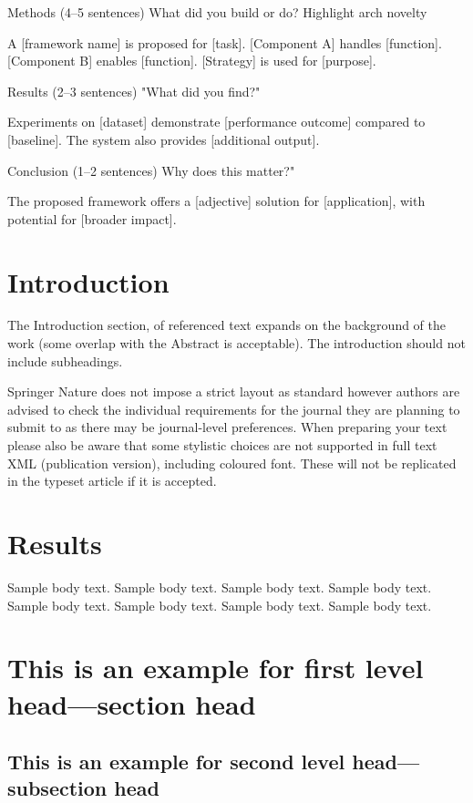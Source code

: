 \documentclass[pdflatex,sn-mathphys-num]{sn-jnl}%
\theoremstyle{thmstyleone}%
\theoremstyle{thmstyletwo}%
\theoremstyle{thmstylethree}%
\begin{document}
Methods (4–5 sentences)
What did you build or do? Highlight arch novelty

A [framework name] is proposed for [task]. [Component A] handles [function]. [Component B] enables [function]. [Strategy] is used for [purpose].

Results (2–3 sentences)
"What did you find?"

Experiments on [dataset] demonstrate [performance outcome] compared to [baseline]. The system also provides [additional output].

Conclusion (1–2 sentences)
Why does this matter?"

The proposed framework offers a [adjective] solution for [application], with potential for [broader impact].
\section{Introduction}\label{sec1}

The Introduction section, of referenced text \cite{bib1} expands on the background of the work (some overlap with the Abstract is acceptable). The introduction should not include subheadings.

Springer Nature does not impose a strict layout as standard however authors are advised to check the individual requirements for the journal they are planning to submit to as there may be journal-level preferences. When preparing your text please also be aware that some stylistic choices are not supported in full text XML (publication version), including coloured font. These will not be replicated in the typeset article if it is accepted. 

\section{Results}\label{sec2}

Sample body text. Sample body text. Sample body text. Sample body text. Sample body text. Sample body text. Sample body text. Sample body text.

\section{This is an example for first level head---section head}\label{sec3}

\subsection{This is an example for second level head---subsection head}\label{subsec2}
\end{document}
